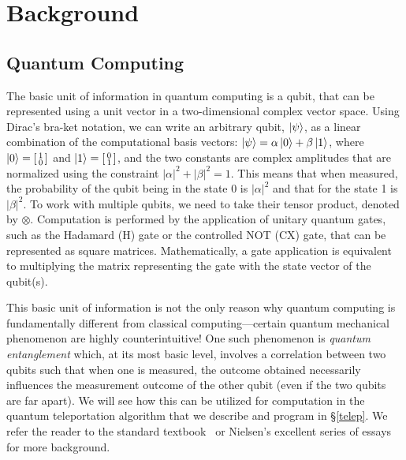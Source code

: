 \documentclass[acmsmall,nonacm,timestamp]{acmart}
\begin{document}
\section{Background}

\subsection{Quantum Computing}
The basic unit of information in quantum computing is a qubit, that can be represented using a unit vector in a two-dimensional complex vector space. Using Dirac's bra-ket notation, we can write an arbitrary qubit, $\ket{\psi}$, as a linear combination of the computational basis vectors: $\ket{\psi} = \alpha\ket{0} + \beta\ket{1}$, where $\ket{0}=\begin{bsmallmatrix}
1 \\
0
\end{bsmallmatrix}$ and $\ket{1}=\begin{bsmallmatrix}
0 \\
1
\end{bsmallmatrix}$, and the two constants are complex amplitudes that are normalized using the constraint $|\alpha|^2 +|\beta|^2 = 1$. This means that when measured, the probability of the qubit being in the state 0 is $|\alpha|^2$ and that for the state 1 is $|\beta|^2$. To work with multiple qubits, we need to take their tensor product, denoted by $\otimes$. Computation is performed by the application of unitary quantum gates, such as the Hadamard (H) gate or the controlled NOT (CX) gate, that can be represented as square matrices. Mathematically, a gate application is equivalent to multiplying the matrix representing the gate with the state vector of the qubit(s).

This basic unit of information is not the only reason why quantum computing is fundamentally different from classical computing---certain quantum mechanical phenomenon are highly counterintuitive! One such phenomenon is \textit{quantum entanglement} which, at its most basic level, involves a correlation between two qubits such that when one is measured, the outcome obtained necessarily influences the measurement outcome of the other qubit (even if the two qubits are far apart). We will see how this can be utilized for computation in the quantum teleportation algorithm that we describe and program in \S\ref{telep}. We refer the reader to the standard textbook~\cite{nielsen_quantum_2010} or Nielsen's excellent series of essays~\cite{matuschak2019} for more background.
\end{document}
